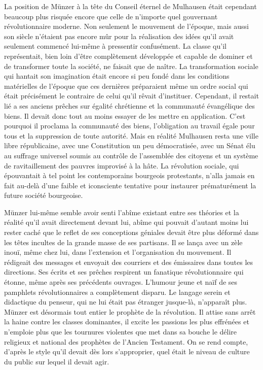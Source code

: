 \documentclass[french,twoside]{book} %
\begin{document}
La position de Münzer à la tête du Conseil éternel de Mulhausen était cependant beaucoup plus risquée encore que celle de n’importe quel gouvernant révolutionnaire moderne. Non seulement le mouvement de l’époque, mais aussi son siècle n’étaient pas encore mûr pour la réalisation des idées qu’il avait seulement commencé lui-même à pressentir confusément. La classe qu’il représentait, bien loin d’être complètement développée et capable de dominer et de transformer toute la société, ne faisait que de naître. La transformation sociale qui hantait son imagination était encore si peu fondé dans les conditions matérielles de l’époque que ces dernières préparaient même un ordre social qui était précisément le contraire de celui qu’il rêvait d’instituer. Cependant, il restait lié a ses anciens prêches sur égalité chrétienne et la communauté évangélique des biens. Il devait donc tout au moins essayer de les mettre en application. C’est pourquoi il proclama la communauté des biens, l’obligation au travail égale pour tous et la suppression de toute autorité. Mais en réalité Mulhausen resta une ville libre républicaine, avec une Constitution un peu démocratisée, avec un Sénat élu au suffrage universel soumis au contrôle de l’assemblée des citoyens et un système de ravitaillement des pauvres improvisé à la hâte. La révolution sociale, qui épouvantait à tel point les contemporains bourgeois protestants, n’alla jamais en fait au-delà d’une faible et iconsciente tentative pour instaurer prématurément la future société bourgeoise.\par
Münzer lui-même semble avoir senti l’abîme existant entre ses théories et la réalité qu’il avait directement devant lui, abîme qui pouvait d’autant moins lui rester caché que le reflet de ses conceptions géniales devait être plus déformé dans les têtes incultes de la grande masse de ses partisans. Il se lança avec un zèle inouï, même chez lui, dans l’extension et l’organisation du mouvement. Il rédigeait des messages et envoyait des courriers et des émissaires dans toutes les directions. Ses écrits et ses prêches respirent un fanatique révolutionnaire qui étonne, même après ses précédents ouvrages. L’humour jeune et naïf de ses pamphlets révolutionnaires a complètement disparu. Le langage serein et didactique du penseur, qui ne lui était pas étranger jusque-là, n’apparaît plus. Münzer est désormais tout entier le prophète de la révolution. Il attise sans arrêt la haine contre les classes dominantes, il excite les passions les plus effrénées et n’emploie plus que les tournures violentes que met dans sa bouche le délire religieux et national des prophètes de l’Ancien Testament. On se rend compte, d’après le style qu’il devait dès lors s’approprier, quel était le niveau de culture du public sur lequel il devait agir.\par
\end{document}
